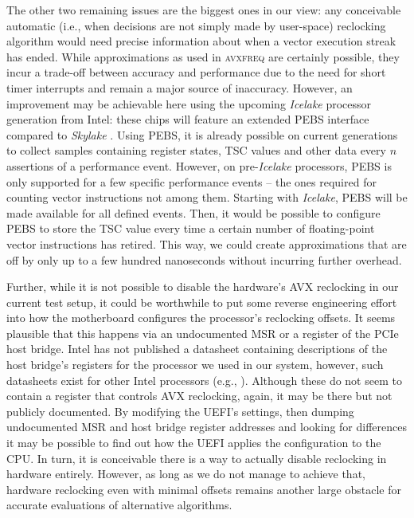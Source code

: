 The other two remaining issues are the biggest ones in our view: any conceivable automatic (i.e., when decisions are not simply made by user-space) reclocking algorithm would need precise information about when a vector execution streak has ended. While approximations as used in \textsc{avxfreq} are certainly possible, they incur a trade-off between accuracy and performance due to the need for short timer interrupts and remain a major source of inaccuracy. However, an improvement may be achievable here using the upcoming \textit{Icelake} processor generation from Intel: these chips will feature an extended \gls{PEBS} interface compared to \textit{Skylake} \cite{intelsdmsysprogguide}. Using \gls{PEBS}, it is already possible on current generations to collect samples containing register states, \gls{TSC} values and other data every $n$ assertions of a performance event. However, on pre-\textit{Icelake} processors, \gls{PEBS} is only supported for a few specific performance events -- the ones required for counting vector instructions not among them. Starting with \textit{Icelake}, \gls{PEBS} will be made available for all defined events. Then, it would be possible to configure \gls{PEBS} to store the \gls{TSC} value every time a certain number of floating-point vector instructions has retired. This way, we could create approximations that are off by only up to a few hundred nanoseconds without incurring further overhead. 

Further, while it is not possible to disable the hardware's \gls{AVX} reclocking in our current test setup, it could be worthwhile to put some reverse engineering effort into how the motherboard configures the processor's reclocking offsets. It seems plausible that this happens via an undocumented \gls{MSR} or a register of the \gls{PCIe} host bridge. Intel has not published a datasheet containing descriptions of the host bridge's registers for the processor we used in our system, however, such datasheets exist for other Intel processors (e.g., \cite{intel7thgendatasheetvol2}). Although these do not seem to contain a register that controls \gls{AVX} reclocking, again, it may be there but not publicly documented. By modifying the \gls{UEFI}'s settings, then dumping undocumented \gls{MSR} and host bridge register addresses and looking for differences it may be possible to find out how the \gls{UEFI} applies the configuration to the \gls{CPU}. In turn, it is conceivable there is a way to actually disable reclocking in hardware entirely. However, as long as we do not manage to achieve that, hardware reclocking even with minimal offsets remains another large obstacle for accurate evaluations of alternative algorithms.

